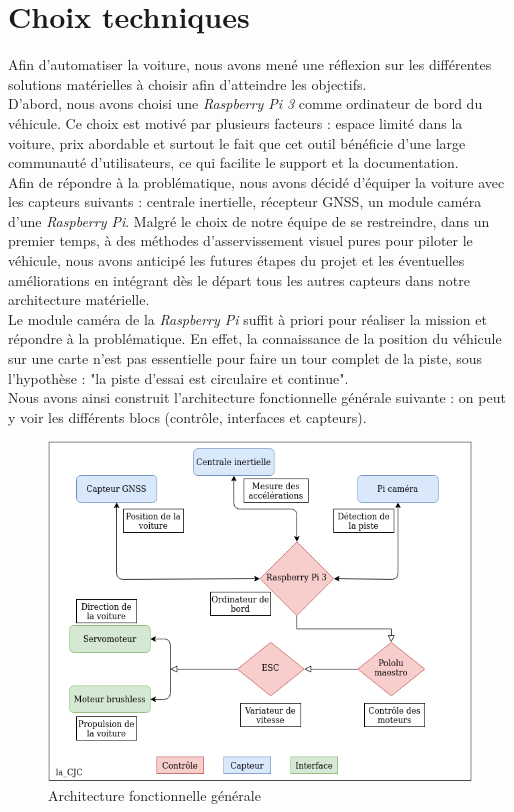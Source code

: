 \documentclass[12pt, openany]{report}
\begin{document}
\section{Choix techniques}
Afin d'automatiser la voiture, nous avons mené une réflexion sur les différentes solutions matérielles à choisir afin d'atteindre les objectifs.\\

D'abord, nous avons choisi une \textit{Raspberry Pi 3} comme ordinateur de bord du véhicule. Ce choix est motivé par plusieurs facteurs : espace limité dans la voiture, prix abordable et surtout le fait que cet outil bénéficie d'une large communauté d'utilisateurs, ce qui facilite le support et la documentation.\\

Afin de répondre à la problématique, nous avons décidé d'équiper la voiture avec les capteurs suivants : centrale inertielle, récepteur \textsc{GNSS}, un module caméra d'une \textit{Raspberry Pi}. Malgré le choix de notre équipe de se restreindre, dans un premier temps, à des méthodes d'asservissement visuel pures pour piloter le véhicule, nous avons anticipé les futures étapes du projet et les éventuelles améliorations en intégrant dès le départ tous les autres capteurs dans notre architecture matérielle.\\

Le module caméra de la \textit{Raspberry Pi} suffit à priori pour réaliser la mission et répondre à la problématique. En effet, la connaissance de la position du véhicule sur une carte n'est pas essentielle pour faire un tour complet de la piste, sous l'hypothèse : "la piste d'essai est circulaire et continue".\\

Nous avons ainsi construit l'architecture fonctionnelle générale suivante : on peut y voir les différents blocs (contrôle, interfaces et capteurs). \\

\begin{figure}[H]
     \centering
     \includegraphics[width=13cm, height = 9cm]{arch_fg.png}
     \caption{Architecture fonctionnelle générale}
     \label{fig:archi_fg}
\end{figure}
\end{document}
